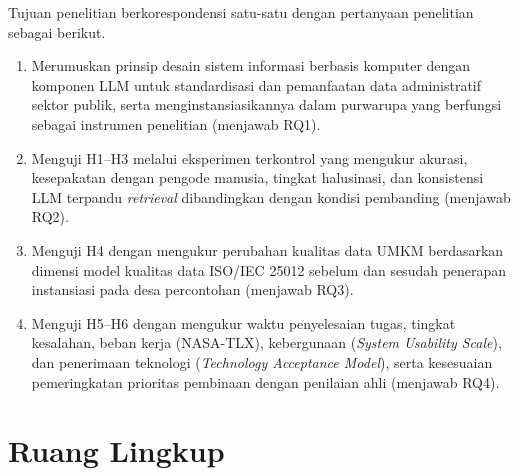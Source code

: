 \documentclass[12pt,a4paper]{report}
\begin{document}
Tujuan penelitian berkorespondensi satu-satu dengan pertanyaan penelitian sebagai berikut.
\begin{enumerate}[label=\textbf{T\arabic*}:, leftmargin=*]
  \item Merumuskan prinsip desain sistem informasi berbasis komputer dengan komponen LLM untuk standardisasi dan pemanfaatan data administratif sektor publik, serta menginstansiasikannya dalam purwarupa yang berfungsi sebagai instrumen penelitian (menjawab RQ1).
  \item Menguji H1--H3 melalui eksperimen terkontrol yang mengukur akurasi, kesepakatan dengan pengode manusia, tingkat halusinasi, dan konsistensi LLM terpandu \textit{retrieval} dibandingkan dengan kondisi pembanding (menjawab RQ2).
  \item Menguji H4 dengan mengukur perubahan kualitas data UMKM berdasarkan dimensi model kualitas data ISO/IEC 25012 sebelum dan sesudah penerapan instansiasi pada desa percontohan (menjawab RQ3).
  \item Menguji H5--H6 dengan mengukur waktu penyelesaian tugas, tingkat kesalahan, beban kerja (NASA-TLX), kebergunaan (\textit{System Usability Scale}), dan penerimaan teknologi (\textit{Technology Acceptance Model}), serta kesesuaian pemeringkatan prioritas pembinaan dengan penilaian ahli (menjawab RQ4).
\end{enumerate}

\section{Ruang Lingkup}
\label{sec:lingkup}
\end{document}
